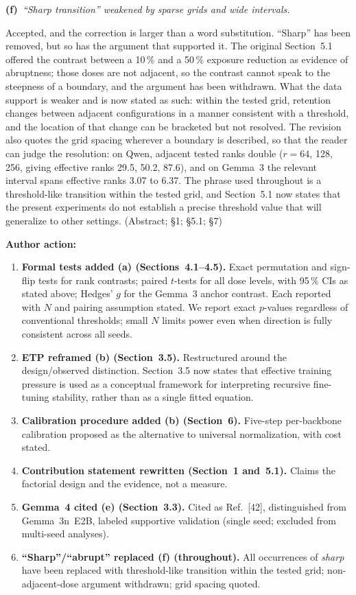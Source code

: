 \documentclass[11pt,a4paper]{article}
\newcommand{\newtext}[1]{#1}
\newcommand{\rsub}[2]{%
  \medskip\noindent\textbf{#1}~\textit{#2}\par\smallskip%
}
\newcommand{\arhead}[1]{\medskip\noindent\textbf{#1}\par\smallskip}
\newcommand{\newtext}[1]{\textcolor{chgcolor}{``#1''}}
\begin{document}
\rsub{(f)}{``Sharp transition'' weakened by sparse grids and wide intervals.}
Accepted, and the correction is larger than a word substitution. ``Sharp''
has been removed, but so has the argument that supported it. The original
Section~5.1 offered the contrast between a 10\,\% and a 50\,\% exposure
reduction as evidence of abruptness; those doses are not adjacent, so the
contrast cannot speak to the steepness of a boundary, and the argument
has been withdrawn. What the data support is weaker and is now stated as
such: within the tested grid, retention changes between adjacent
configurations in a manner consistent with a threshold, and the location
of that change can be bracketed but not resolved. The revision also
quotes the grid spacing wherever a boundary is described, so that the
reader can judge the resolution: on Qwen, adjacent tested ranks double
($r=64$, 128, 256, giving effective ranks 29.5, 50.2, 87.6), and on
Gemma~3 the relevant interval spans effective ranks 3.07 to 6.37. The
phrase used throughout is \newtext{a threshold-like transition within the
tested grid}, and Section~5.1 now states that \newtext{the present
experiments do not establish a precise threshold value that will
generalize to other settings}.
\newtext{(Abstract; \S1; \S5.1; \S7)}

\arhead{Author action:}
\begin{enumerate}[leftmargin=1.4em,itemsep=0.3em]
\item \textbf{Formal tests added (a) (Sections~4.1--4.5).}
      Exact permutation and sign-flip tests for rank contrasts; paired
      $t$-tests for all dose levels, with 95\,\% CIs as stated above; Hedges' $g$ for the
      Gemma~3 anchor contrast. Each reported with $N$ and pairing
      assumption stated. We report exact $p$-values regardless
      of conventional thresholds; small $N$ limits power even when
      direction is fully consistent across all seeds.
\item \textbf{ETP reframed (b) (Section~3.5).}
      Restructured around the design/observed distinction.
      Section~3.5 now states that effective training pressure is used \newtext{as a conceptual framework for interpreting recursive fine-tuning stability, rather than as a single fitted equation.}
\item \textbf{Calibration procedure added (b) (Section~6).}
      Five-step per-backbone calibration proposed as the alternative
      to universal normalization, with cost stated.
\item \textbf{Contribution statement rewritten (Section~1 and~5.1).}
      Claims the factorial design and the evidence, not a measure.
\item \textbf{Gemma~4 cited (e) (Section~3.3).}
      Cited as Ref.~[42], distinguished from Gemma~3n~E2B, labeled
      supportive validation (single seed; excluded from multi-seed
      analyses).
\item \textbf{``Sharp''/``abrupt'' replaced (f) (throughout).}
      All occurrences of \textit{sharp} have been replaced with
      \newtext{threshold-like transition within the tested grid};
      non-adjacent-dose argument withdrawn; grid spacing quoted.
\end{enumerate}
\end{document}
